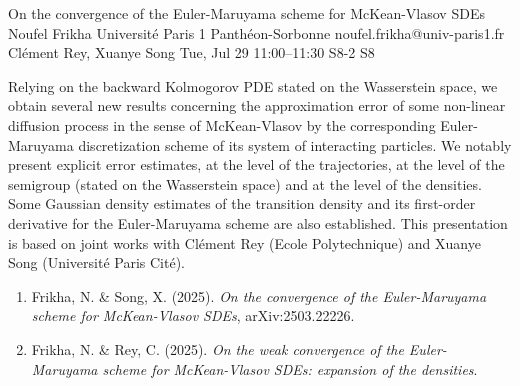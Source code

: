 \begin{talk}
  {On the convergence of the Euler-Maruyama scheme for McKean-Vlasov SDEs}%
  {Noufel Frikha}%
  {Universit\'e Paris 1 Panth\'eon-Sorbonne}%
  {noufel.frikha@univ-paris1.fr}%
  {Cl\'ement Rey, Xuanye Song}%
  {}%
  {Tue, Jul 29 11:00--11:30}%
  {S8-2}%
  {S8}%
  
    
   
Relying on the backward Kolmogorov PDE stated on the Wasserstein space, we obtain several new results concerning the approximation error of some non-linear diffusion process in the sense of McKean-Vlasov by the corresponding Euler-Maruyama discretization scheme of its system of interacting particles. We notably present explicit error estimates, at the level of the trajectories, at the level of the semigroup (stated on the Wasserstein space) and at the level of the densities. Some Gaussian density estimates of the transition density and its first-order derivative for the Euler-Maruyama scheme are also established. This presentation is based on joint works with Cl\'ement Rey (Ecole Polytechnique) and Xuanye Song (Universit\'e Paris Cit\'e).

\medskip


\begin{enumerate}
 \item[{[1]}] Frikha, N.  \& Song, X. (2025). {\it On the convergence of the Euler-Maruyama scheme for McKean-Vlasov SDEs}, arXiv:2503.22226.
 \item[{[2]}] Frikha, N. \& Rey, C. (2025).  {\it On the weak convergence of the Euler-Maruyama scheme for McKean-Vlasov SDEs: expansion of the densities}.
\end{enumerate}


\end{talk}

